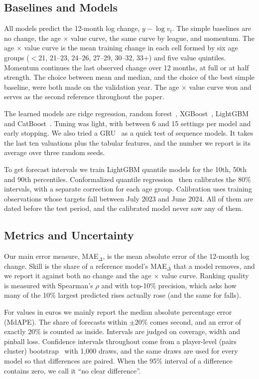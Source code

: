 \documentclass[conference]{IEEEtran}
\begin{document}
\subsection{Baselines and Models}
All models predict the 12-month log change, $y-\log v_t$. The simple baselines are no change, the age $\times$ value curve, the same curve by league, and momentum. The age $\times$ value curve is the mean training change in each cell formed by six age groups ($<$21, 21--23, 24--26, 27--29, 30--32, 33+) and five value quintiles. Momentum continues the last observed change over 12 months, at full or at half strength. The choice between mean and median, and the choice of the best simple baseline, were both made on the validation year. The age $\times$ value curve won and serves as the second reference throughout the paper.

The learned models are ridge regression, random forest~\cite{breiman2001random}, XGBoost~\cite{chen2016xgboost}, LightGBM~\cite{ke2017lightgbm} and CatBoost~\cite{prokhorenkova2018catboost}. Tuning was light, with between 6 and 15 settings per model and early stopping. We also tried a GRU~\cite{cho2014gru} as a quick test of sequence models. It takes the last ten valuations plus the tabular features, and the number we report is its average over three random seeds.

To get forecast intervals we train LightGBM quantile models for the 10th, 50th and 90th percentiles. Conformalized quantile regression~\cite{romano2019conformalized} then calibrates the 80\% intervals, with a separate correction for each age group. Calibration uses \NCalRows{} training observations whose targets fall between July 2023 and June 2024. All of them are dated before the test period, and the calibrated model never saw any of them.

\subsection{Metrics and Uncertainty}\label{sec:metrics}
Our main error measure, MAE$_\Delta$, is the mean absolute error of the 12-month log change. Skill is the share of a reference model's MAE$_\Delta$ that a model removes, and we report it against both no change and the age $\times$ value curve. Ranking quality is measured with Spearman's $\rho$ and with top-10\% precision, which asks how many of the 10\% largest predicted rises actually rose (and the same for falls).

For values in euros we mainly report the median absolute percentage error (MdAPE). The share of forecasts within $\pm$20\% comes second, and an error of exactly 20\% is counted as inside. Intervals are judged on coverage, width and pinball loss. Confidence intervals throughout come from a player-level (pairs cluster) bootstrap~\cite{mackinnon2023cluster} with 1,000 draws, and the same draws are used for every model so that differences are paired. When the 95\% interval of a difference contains zero, we call it ``no clear difference''.
\end{document}
